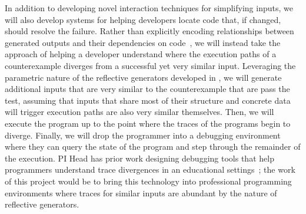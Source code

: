 

In addition to developing novel interaction techniques for simplifying inputs,
we will also develop systems for helping developers locate code that, if
changed, should resolve the failure. Rather than explicitly encoding
relationships between generated outputs and their dependencies on
code~\cite{ref:ko2009finding}, we will instead take the approach of helping a
developer understand where the execution paths of a counterexample diverges from
a successful yet very similar input. Leveraging the parametric nature of the
reflective generators developed in , we will generate
additional inputs that are very similar to the counterexample that are pass the
test, assuming that inputs that share most of their structure and concrete data
will trigger execution paths are also very similar themselves. Then, we will
execute the program up to the point where the traces of the programs begin to
diverge. Finally, we will drop the programmer into a debugging environment where
they can query the state of the program and step through the remainder of the
execution. PI Head has prior work designing debugging tools that help
programmers understand trace divergences in an educational
settings~\cite{ref:suzuki2017tracediff}; the work of this project would be to
bring this technology into professional programming environments where traces
for similar inputs are abundant by the nature of reflective generators.



